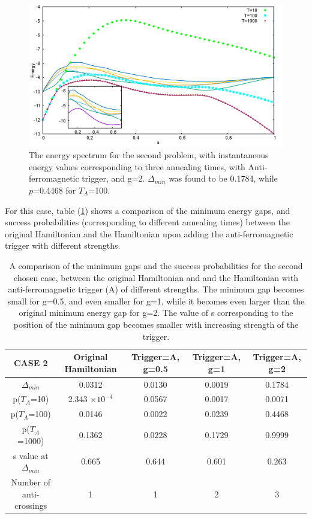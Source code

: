 \documentclass[../main.tex]{subfiles}
\begin{document}
\begin{figure}[H]
\centering 
\includegraphics[scale=0.3]{950_s12_A_g2.png}
\caption{The energy spectrum for the second problem, with instantaneous energy values corresponding to three annealing times, with Anti-ferromagnetic trigger, and g=2. $\Delta_{min}$ was found to be 0.1784, while $p$=0.4468 for $T_A$=100. }
\label{fig:a6}
\end{figure}
For this case, table (\ref{tab:a2}) shows a comparison of the minimum energy gaps, and success probabilities (corresponding to different annealing times) between the original Hamiltonian and the Hamiltonian upon adding the anti-ferromagnetic trigger with different strengths. 

\begin{table}[H]
\centering
\renewcommand{\arraystretch}{1.5}
\begin{tabular}{|c|c|c|c|c|}
\hline 
CASE 2 & Original Hamiltonian & Trigger=A, g=0.5 & Trigger=A, g=1 & Trigger=A, g=2 \\ 
\hline 
$\Delta_{min}$ & 0.0312 & 0.0130 & 0.0019 & 0.1784 \\ 
\hline 
p($T_A$=10) & 2.343 $\times 10^{-4}$ & 0.0567 & 0.0017 & 0.0071\\ 
\hline 
p($T_A$=100) & 0.0146 & 0.0022 & 0.0239 & 0.4468 \\ 
\hline 
p($T_A$=1000) & 0.1362 & 0.0228 & 0.1729 & 0.9999 \\ 
\hline 
s value at $\Delta_{min}$ & 0.665 & 0.644 & 0.601 & 0.263 \\ 
\hline 
Number of anti-crossings & 1 & 1 & 2 & 3 \\
\hline
\end{tabular} 
\caption{A comparison of the minimum gaps and the success probabilities for the second chosen case, between the original Hamiltonian and and the Hamiltonian with anti-ferromagnetic trigger (A) of different strengths. The minimum gap becomes small for g=0.5, and even smaller for g=1, while it becomes even larger than the original minimum energy gap for g=2. The value of s corresponding to the position of the minimum gap becomes smaller with increasing strength of the trigger.}
\label{tab:a2}
\end{table}
\end{document}
